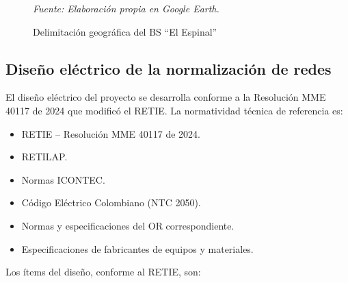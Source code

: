 \begin{figure}[H]
\centering
\caption{Delimitación geográfica del BS ``El Espinal''}
\label{fig:delimitacion_bs}
\footnotesize\textit{Fuente: Elaboración propia en Google Earth.}
\end{figure}


\subsection{Diseño eléctrico de la normalización de redes}
\label{subsec:disenio_electrico}

El diseño eléctrico del proyecto se desarrolla conforme a la Resolución
MME 40117 de 2024 que modificó el RETIE. La normatividad técnica de
referencia es:

\begin{itemize}
    \item RETIE -- Resolución MME 40117 de 2024.
    \item RETILAP.
    \item Normas ICONTEC.
    \item Código Eléctrico Colombiano (NTC 2050).
    \item Normas y especificaciones del OR correspondiente.
    \item Especificaciones de fabricantes de equipos y materiales.
\end{itemize}

Los ítems del diseño, conforme al RETIE, son:

